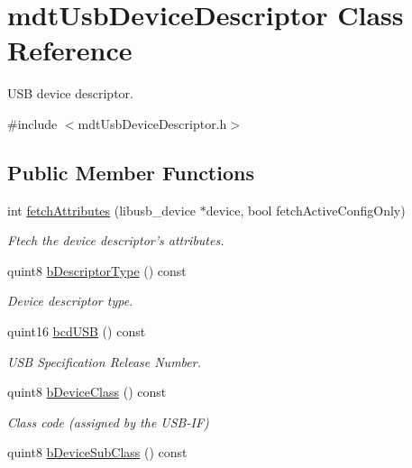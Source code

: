 \hypertarget{classmdt_usb_device_descriptor}{
\section{mdtUsbDeviceDescriptor Class Reference}
\label{classmdt_usb_device_descriptor}
}


USB device descriptor.  




{\ttfamily \#include $<$mdtUsbDeviceDescriptor.h$>$}

\subsection*{Public Member Functions}
\begin{DoxyCompactItemize}
\item 
int \hyperlink{classmdt_usb_device_descriptor_a6239e5e56e2e25a686cac98b18158500}{fetchAttributes} (libusb\_\-device $\ast$device, bool fetchActiveConfigOnly)
\begin{DoxyCompactList}\small\item\em Ftech the device descriptor's attributes. \end{DoxyCompactList}\item 
\hypertarget{classmdt_usb_device_descriptor_add8de4e1850995461a37ed27b75b4381}{
quint8 \hyperlink{classmdt_usb_device_descriptor_add8de4e1850995461a37ed27b75b4381}{bDescriptorType} () const }
\label{classmdt_usb_device_descriptor_add8de4e1850995461a37ed27b75b4381}

\begin{DoxyCompactList}\small\item\em Device descriptor type. \end{DoxyCompactList}\item 
quint16 \hyperlink{classmdt_usb_device_descriptor_ae5f4d1cabe204ca0aa00735d04516e86}{bcdUSB} () const 
\begin{DoxyCompactList}\small\item\em USB Specification Release Number. \end{DoxyCompactList}\item 
\hypertarget{classmdt_usb_device_descriptor_a94e04915c8df9102db54068911b92532}{
quint8 \hyperlink{classmdt_usb_device_descriptor_a94e04915c8df9102db54068911b92532}{bDeviceClass} () const }
\label{classmdt_usb_device_descriptor_a94e04915c8df9102db54068911b92532}

\begin{DoxyCompactList}\small\item\em Class code (assigned by the USB-\/IF) \end{DoxyCompactList}\item 
\hypertarget{classmdt_usb_device_descriptor_a50b483ed26f546017bde4ae6f9762268}{
quint8 \hyperlink{classmdt_usb_device_descriptor_a50b483ed26f546017bde4ae6f9762268}{bDeviceSubClass} () const }
\label{classmdt_usb_device_descriptor_a50b483ed26f546017bde4ae6f9762268}


\end{DoxyCompactItemize}
